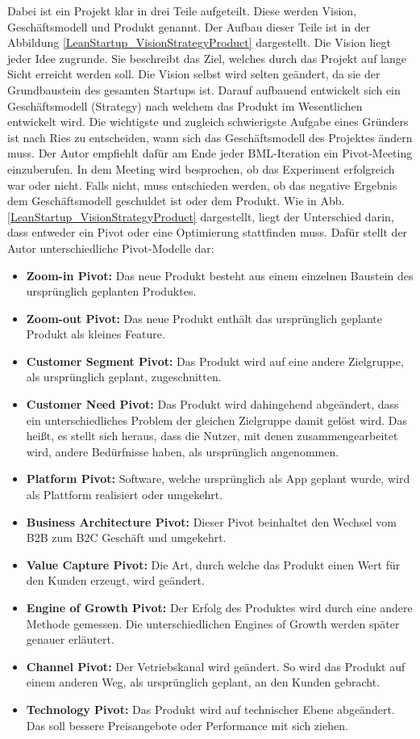 Dabei ist ein Projekt klar in drei Teile aufgeteilt. Diese werden Vision, Geschäftsmodell und Produkt genannt. Der Aufbau dieser Teile ist in der Abbildung \ref{LeanStartup_VisionStrategyProduct} dargestellt. 
Die Vision liegt jeder Idee zugrunde. Sie beschreibt das Ziel, welches durch das Projekt auf lange Sicht erreicht werden soll. Die Vision selbst wird selten geändert, da sie der Grundbaustein des gesamten Startups ist. Darauf aufbauend entwickelt sich ein Geschäftsmodell (Strategy) nach welchem das Produkt im Wesentlichen entwickelt wird. Die wichtigste und zugleich schwierigste Aufgabe eines Gründers ist nach Ries zu entscheiden, wann sich das Geschäftsmodell des Projektes ändern muss. Der Autor empfiehlt dafür am Ende jeder \ac{BML}-Iteration ein Pivot-Meeting einzuberufen. In dem Meeting wird besprochen, ob das Experiment erfolgreich war oder nicht. Falls nicht, muss entschieden werden, ob das negative Ergebnis dem Geschäftsmodell geschuldet ist oder dem Produkt. Wie in Abb. \ref{LeanStartup_VisionStrategyProduct} dargestellt, liegt der Unterschied darin, dass entweder ein Pivot oder eine Optimierung stattfinden muss. Dafür stellt der Autor unterschiedliche Pivot-Modelle dar:
\begin{itemize}
	\item \textbf{Zoom-in Pivot:} Das neue Produkt besteht aus einem einzelnen Baustein des ursprünglich geplanten Produktes.
	\item \textbf{Zoom-out Pivot:} Das neue Produkt enthält das ursprünglich geplante Produkt als kleines Feature.
	\item \textbf{Customer Segment Pivot:} Das Produkt wird auf eine andere Zielgruppe, als ursprünglich geplant, zugeschnitten.
	\item \textbf{Customer Need Pivot:} Das Produkt wird dahingehend abgeändert, dass ein unterschiedliches Problem der gleichen Zielgruppe damit gelöst wird. Das heißt, es stellt sich heraus, dass die Nutzer, mit denen zusammengearbeitet wird, andere Bedürfnisse haben, als ursprünglich angenommen.
	\item \textbf{Platform Pivot:} Software, welche ursprünglich als App geplant wurde, wird als Plattform realisiert oder umgekehrt.
	\item \textbf{Business Architecture Pivot:} Dieser Pivot beinhaltet den Wechsel vom B2B zum B2C Geschäft und umgekehrt.
	\item \textbf{Value Capture Pivot:} Die Art, durch welche das Produkt einen Wert für den Kunden erzeugt, wird geändert. 
	\item \textbf{Engine of Growth Pivot:} Der Erfolg des Produktes wird durch eine andere Methode gemessen. Die unterschiedlichen Engines of Growth werden später genauer erläutert.
	\item \textbf{Channel Pivot:} Der Vetriebskanal wird geändert. So wird das Produkt auf einem anderen Weg, als ursprünglich geplant, an den Kunden gebracht.
	\item \textbf{Technology Pivot:} Das Produkt wird auf technischer Ebene abgeändert. Das soll bessere Preisangebote oder Performance mit sich ziehen.
\end{itemize}
